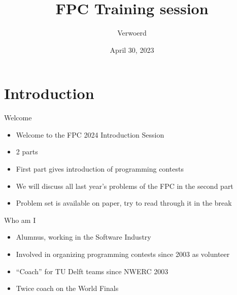 \documentclass[11pt,pdf, aspectratio=169]{beamer}
\title{FPC Training session}
\author{Verwoerd}
\date{April 30, 2023}
\begin{document}
  \section{Introduction}
  \begin{frame}{Welcome}
    \begin{itemize}
      \item Welcome to the FPC 2024 Introduction Session
      \item 2 parts
      \item First part gives introduction of programming contests
      \item We will discuss all last year's problems of the FPC in the second part
      \item Problem set is available on paper, try to read through it in the break
    \end{itemize}
  \end{frame}
  \begin{frame}{Who am I}
    \begin{itemize}
      \item Alumnus, working in the Software Industry
      \item Involved in organizing programming contests since 2003 as volunteer
      \item ``Coach'' for TU Delft teams since NWERC 2003
      \item Twice coach on the World Finals
    \end{itemize}
    \doclicenseThis
  \end{frame}
\end{document}
